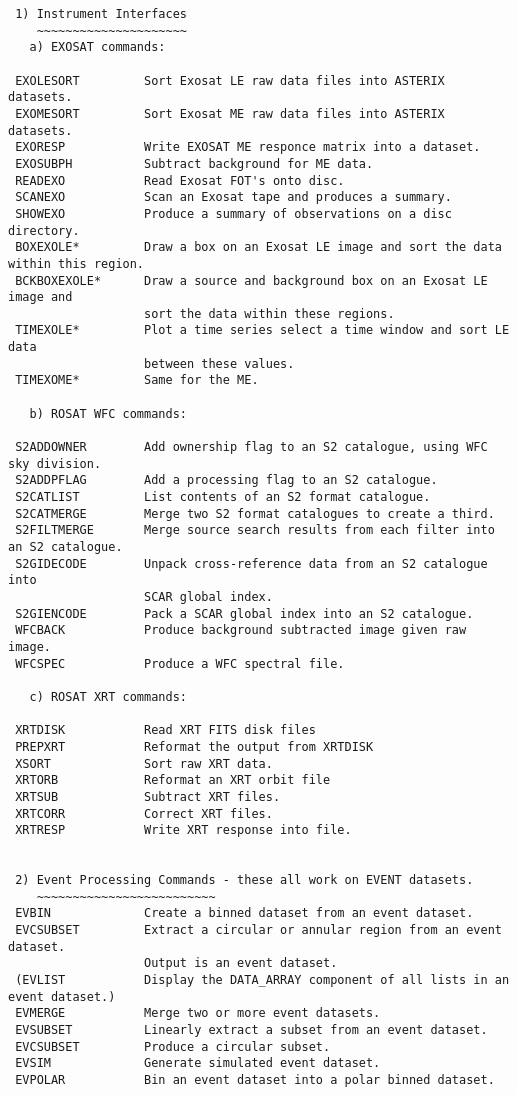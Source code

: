 \small
\begin{verbatim}
 1) Instrument Interfaces
    ~~~~~~~~~~~~~~~~~~~~~
   a) EXOSAT commands:

 EXOLESORT         Sort Exosat LE raw data files into ASTERIX datasets.
 EXOMESORT         Sort Exosat ME raw data files into ASTERIX datasets.
 EXORESP           Write EXOSAT ME responce matrix into a dataset.
 EXOSUBPH          Subtract background for ME data.
 READEXO           Read Exosat FOT's onto disc.
 SCANEXO           Scan an Exosat tape and produces a summary.
 SHOWEXO           Produce a summary of observations on a disc directory.
 BOXEXOLE*         Draw a box on an Exosat LE image and sort the data within this region.
 BCKBOXEXOLE*      Draw a source and background box on an Exosat LE image and
                   sort the data within these regions.
 TIMEXOLE*         Plot a time series select a time window and sort LE data
                   between these values.
 TIMEXOME*         Same for the ME.

   b) ROSAT WFC commands:

 S2ADDOWNER        Add ownership flag to an S2 catalogue, using WFC sky division.
 S2ADDPFLAG        Add a processing flag to an S2 catalogue.
 S2CATLIST         List contents of an S2 format catalogue.
 S2CATMERGE        Merge two S2 format catalogues to create a third.
 S2FILTMERGE       Merge source search results from each filter into an S2 catalogue.
 S2GIDECODE        Unpack cross-reference data from an S2 catalogue into
                   SCAR global index.
 S2GIENCODE        Pack a SCAR global index into an S2 catalogue.
 WFCBACK           Produce background subtracted image given raw image.
 WFCSPEC           Produce a WFC spectral file.

   c) ROSAT XRT commands:

 XRTDISK           Read XRT FITS disk files
 PREPXRT           Reformat the output from XRTDISK 
 XSORT             Sort raw XRT data.
 XRTORB            Reformat an XRT orbit file
 XRTSUB            Subtract XRT files.
 XRTCORR           Correct XRT files.
 XRTRESP           Write XRT response into file.


 2) Event Processing Commands - these all work on EVENT datasets.
    ~~~~~~~~~~~~~~~~~~~~~~~~~
 EVBIN             Create a binned dataset from an event dataset.
 EVCSUBSET         Extract a circular or annular region from an event dataset.
                   Output is an event dataset.
 (EVLIST           Display the DATA_ARRAY component of all lists in an event dataset.)
 EVMERGE           Merge two or more event datasets.
 EVSUBSET          Linearly extract a subset from an event dataset.
 EVCSUBSET         Produce a circular subset.
 EVSIM             Generate simulated event dataset.
 EVPOLAR           Bin an event dataset into a polar binned dataset.



\end{verbatim}
